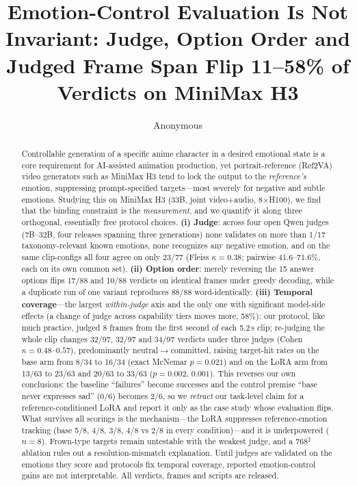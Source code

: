 \documentclass{article}
\title{Emotion-Control Evaluation Is Not Invariant: Judge, Option Order and
Judged Frame Span Flip 11--58\% of Verdicts on MiniMax H3}
\author{Anonymous}
\date{}
\begin{document}
\maketitle

\begin{abstract}
Controllable generation of a specific anime character in a desired emotional state is a core
requirement for AI-assisted animation production, yet portrait-reference (Ref2VA) video
generators such as MiniMax H3 tend to lock the output to the \emph{reference's} emotion,
suppressing prompt-specified targets---most severely for negative and subtle emotions. Studying this
on MiniMax H3 (33B, joint video+audio, 8$\times$H100), we find that the binding constraint is the
\emph{measurement}, and we quantify it along three orthogonal, essentially free protocol choices.
\textbf{(i) Judge}: across four open Qwen judges (7B--32B, four releases spanning three generations) none validates on more
than 1/17 taxonomy-relevant known emotions, none recognizes any negative emotion, and on the same
clip-configs all four agree on only 23/77 (Fleiss $\kappa{=}0.38$; pairwise 41.6--71.6\%, each on its own common set).
\textbf{(ii) Option order}: merely reversing the 15 answer options flips 17/88 and 10/88 verdicts on
identical frames under greedy decoding, while a duplicate run of one variant reproduces 88/88 word-identically. \textbf{(iii) Temporal
coverage}---the largest \emph{within-judge} axis and the only one with significant model-side effects (a change of judge across
capability tiers moves more, 58\%): our protocol, like much practice, judged 8
frames from the first second of each 5.2\,s clip; re-judging the whole clip changes 32/97, 32/97 and 34/97
verdicts under three judges (Cohen $\kappa{=}0.48$--$0.57$), predominantly
neutral$\rightarrow$committed, raising target-hit rates on the base arm from 8/34 to 16/34 (exact
McNemar $p{=}0.021$) and on the LoRA arm from 13/63 to 23/63 and 20/63 to 33/63 ($p{=}0.002$, $0.001$). This
reverses our own conclusions: the baseline ``failures'' become successes and the control premise
``base never expresses sad'' (0/6) becomes 2/6, so we \emph{retract} our task-level claim for a
reference-conditioned LoRA and report it only as the case study whose evaluation flips. What survives
all scorings is the mechanism---the LoRA suppresses reference-emotion tracking (base 5/8, 4/8, 3/8,
4/8 vs 2/8 in every condition)---and it is underpowered ($n{=}8$). Frown-type targets remain
untestable with the weakest judge, and a 768$^2$ ablation rules out a resolution-mismatch
explanation. Until judges are validated on the emotions they score and protocols fix temporal
coverage, reported emotion-control gains are not interpretable. All verdicts, frames and scripts
are released.
\end{abstract}
\end{document}
